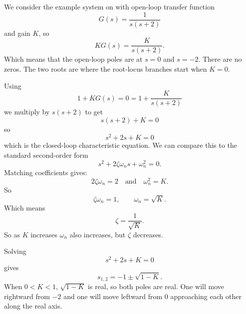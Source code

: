 \begin{exa}
  We consider the example system on  with open-loop transfer function
  \begin{equation*}
    G(s) = \frac{1}{s (s+2)}
  \end{equation*}
  and gain $K$, so
  \begin{equation*}
    KG(s) = \frac{K}{s(s+2)}
  .\end{equation*}
  Which means that the open-loop poles are at $s = 0$ and $s = -2$.
  There are no zeros.
  The two roots are where the root-locus branches start when $K = 0$.

  Using
  \begin{equation*}
    1 + KG(s) = 0 = 1+ \frac{K}{s(s+2)}
  \end{equation*}
  we multiply by $s(s+2)$ to get
  \begin{equation*}
    s(s+2) + K = 0
  \end{equation*}
  so
  \begin{equation*}
    s^2 + 2s + K = 0
  \end{equation*}
  which is the closed-loop characteristic equation.
  We can compare this to the standard second-order form
  \begin{equation*}
    s^2 + 2 \zeta \omega_n s + \omega_n^2 = 0
  .\end{equation*}
  Matching coefficients gives:
  \begin{equation*}
    2\zeta \omega_n = 2 \quad \text{and} \quad \omega_n^2 = K
  .\end{equation*}
  So
  \begin{equation*}
    \zeta \omega_n = 1, \qquad \omega_n = \sqrt{K}
  .\end{equation*}
  Which means
  \begin{equation*}
    \zeta = \frac{1}{\sqrt{K}}
  .\end{equation*}
  So as $K$ increases $\omega_n$ also increases, but $\zeta$ decreases.

  Solving
  \begin{equation*}
    s^2 + 2s + K = 0
  \end{equation*}
  gives
  \begin{equation*}
    s_{1,2 } = -1 \pm \sqrt{1 - K}
  .\end{equation*}
  When $0 < K < 1$, $\sqrt{1 - K}$ is real, so both poles are real.
  One will move rightward from $-2$ and one will move leftward from 0 approaching each other along the real axis.


\end{exa}
